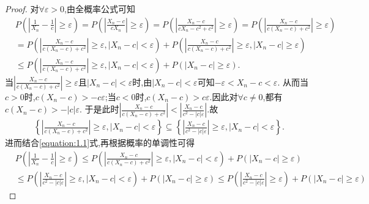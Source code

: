 \documentclass[lang=cn,newtx,10pt,scheme=chinese]{../../Template/elegantbook}
\begin{document}
\begin{proof}
    对\(\forall \varepsilon > 0\),由全概率公式可知
\begin{equation}\label{equation:1.1}
\begin{aligned}
   &P\left(\left|\frac{1}{X_n} - \frac{1}{c}\right| \geqslant \varepsilon\right) = P\left(\left|\frac{X_n - c}{cX_n}\right| \geqslant \varepsilon\right) = P\left(\left|\frac{X_n - c}{cX_n - c^2 + c^2}\right| \geqslant \varepsilon\right) = P\left(\left|\frac{X_n - c}{c(X_n - c) + c^2}\right| \geqslant \varepsilon\right)
   \\
   &= P\left(\left|\frac{X_n - c}{c(X_n - c) + c^2}\right| \geqslant \varepsilon,\left|X_n - c\right| < \varepsilon\right) + P\left(\left|\frac{X_n - c}{c(X_n - c) + c^2}\right| \geqslant \varepsilon,\left|X_n - c\right| \geqslant \varepsilon\right)
   \\
   &\leqslant P\left(\left|\frac{X_n - c}{c(X_n - c) + c^2}\right| \geqslant \varepsilon,\left|X_n - c\right| < \varepsilon\right) + P\left(\left|X_n - c\right| \geqslant \varepsilon\right).
\end{aligned}
\end{equation}
当\(\left|\frac{X_n - c}{c(X_n - c) + c^2}\right| \geqslant \varepsilon\)且\(\left|X_n - c\right| < \varepsilon\)时,由\(\left|X_n - c\right| < \varepsilon\)可知\(-\varepsilon < X_n - c < \varepsilon\).
从而当\(c > 0\)时,\(c(X_n - c) > -c\varepsilon\);当\(c < 0\)时,\(c(X_n - c) > c\varepsilon\).因此对\(\forall c \neq 0\),都有\(c(X_n - c) > -|c|\varepsilon\).
于是此时\(\left|\frac{X_n - c}{c(X_n - c) + c^2}\right| < \left|\frac{X_n - c}{c^2 - |c|\varepsilon}\right|\).故
\begin{align*}
   \left\{\left|\frac{X_n - c}{c(X_n - c) + c^2}\right| \geqslant \varepsilon,\left|X_n - c\right| < \varepsilon\right\} \subseteq \left\{\left|\frac{X_n - c}{c^2 - |c|\varepsilon}\right| \geqslant \varepsilon,\left|X_n - c\right| < \varepsilon\right\}.
\end{align*}
进而结合\eqref{equation:1.1}式,再根据概率的单调性可得
\begin{align*}
    &P\left(\left|\frac{1}{X_n} - \frac{1}{c}\right| \geqslant \varepsilon\right) \leqslant P\left(\left|\frac{X_n - c}{c(X_n - c) + c^2}\right| \geqslant \varepsilon,\left|X_n - c\right| < \varepsilon\right) + P\left(\left|X_n - c\right| \geqslant \varepsilon\right)
    \\
    &\leqslant P\left(\left|\frac{X_n - c}{c^2 - |c|\varepsilon}\right| \geqslant \varepsilon,\left|X_n - c\right| < \varepsilon\right) + P\left(\left|X_n - c\right| \geqslant \varepsilon\right) \leqslant P\left(\left|\frac{X_n - c}{c^2 - |c|\varepsilon}\right| \geqslant \varepsilon\right) + P\left(\left|X_n - c\right| \geqslant \varepsilon\right)

\end{align*}
\end{proof}
\end{document}
